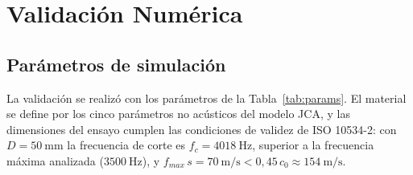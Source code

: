 \documentclass[11pt,a4paper]{article}
\begin{document}
\section{Validación Numérica}
\label{sec:validacion}

\subsection{Parámetros de simulación}
La validación se realizó con los parámetros de la Tabla~\ref{tab:params}. El material se define por los cinco parámetros no acústicos del modelo JCA, y las dimensiones del ensayo cumplen las condiciones de validez de ISO 10534-2: con $D=50\ \mathrm{mm}$ la frecuencia de corte es $f_c=4018\ \mathrm{Hz}$, superior a la frecuencia máxima analizada ($3500\ \mathrm{Hz}$), y $f_{max}\,s=70\ \mathrm{m/s}<0{,}45\,c_0\approx 154\ \mathrm{m/s}$.
\end{document}
